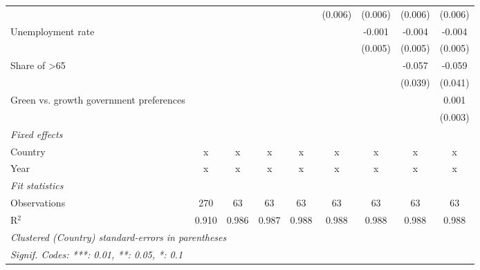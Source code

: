 \begin{table}[htbp]
\begin{tabular}{lcccccccc}
                                                              &         &         &         &               & (0.006)       & (0.006)       & (0.006)       & (0.006)\\   
      Unemployment rate                                       &         &         &         &               &               & -0.001        & -0.004        & -0.004\\   
                                                              &         &         &         &               &               & (0.005)       & (0.005)       & (0.005)\\   
      Share of >65                                            &         &         &         &               &               &               & -0.057        & -0.059\\   
                                                              &         &         &         &               &               &               & (0.039)       & (0.041)\\   
      Green vs. growth government preferences                 &         &         &         &               &               &               &               & 0.001\\   
                                                              &         &         &         &               &               &               &               & (0.003)\\   
      \emph{Fixed effects}\\
      Country                                                 & x       & x       & x       & x             & x             & x             & x             & x\\  
      Year                                                    & x       & x       & x       & x             & x             & x             & x             & x\\  
      \midrule \emph{Fit statistics}\\
      Observations                                            & 270     & 63      & 63      & 63            & 63            & 63            & 63            & 63\\  
      R$^2$                                                   & 0.910   & 0.986   & 0.987   & 0.988         & 0.988         & 0.988         & 0.988         & 0.988\\  
      \midrule
      \multicolumn{9}{l}{\emph{Clustered (Country) standard-errors in parentheses}}\\
      \multicolumn{9}{l}{\emph{Signif. Codes: ***: 0.01, **: 0.05, *: 0.1}}\\
   \end{tabular}
\end{table}


